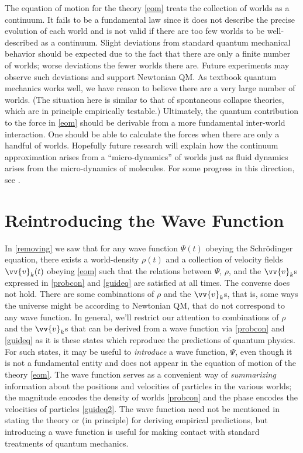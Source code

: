 \documentclass[12pt,secnumarabic,balancelastpage,amsmath,amssymb,nofootinbib]{article}
\begin{document}
The equation of motion for the theory \eqref{eom} treats the collection of worlds as a continuum.  It fails to be a fundamental law since it does not describe the precise evolution of each world and is not valid if there are too few worlds to be well-described as a continuum.  Slight deviations from standard quantum mechanical behavior should be expected due to the fact that there are only a finite number of worlds; worse deviations the fewer worlds there are.  Future experiments may observe such deviations and support Newtonian QM.  As textbook quantum mechanics works well, we have reason to believe there are a very large number of worlds.  (The situation here is similar to that of spontaneous collapse theories, which are in principle empirically testable.)  Ultimately, the quantum contribution to the force in \eqref{eom} should be derivable from a more fundamental inter-world interaction.  One should be able to calculate the forces when there are only a handful of worlds.  Hopefully future research will explain how the continuum approximation arises from a ``micro-dynamics'' of worlds just as fluid dynamics arises from the micro-dynamics of molecules.  For some progress in this direction, see \citet{HDW}.

\section{Reintroducing the Wave Function}\label{defining}

In \textsection \ref{removing} we saw that for any wave function $\Psi(t)$ obeying the Schr\"{o}dinger equation, there exists a world-density $\rho(t)$ and a collection of velocity fields $\vv{v}_k(t)$ obeying \eqref{eom} such that the relations between $\Psi$, $\rho$, and the $\vv{v}_k$s expressed in \eqref{probcon} and \eqref{guideq} are satisfied at all times.  The converse does not hold.  There are some combinations of $\rho$ and the $\vv{v}_k$s, that is, some ways the universe might be according to Newtonian QM, that do not correspond to any wave function.  In general, we'll restrict our attention to combinations of $\rho$ and the $\vv{v}_k$s that can be derived from a wave function via \eqref{probcon} and \eqref{guideq} as it is these states which reproduce the predictions of quantum physics.  For such states, it may be useful to \emph{introduce} a wave function, $\Psi$, even though it is not a fundamental entity and does not appear in the equation of motion of the theory \eqref{eom}.  The wave function serves as a convenient way of \emph{summarizing} information about the positions and velocities of particles in the various worlds; the magnitude encodes the density of worlds \eqref{probcon} and the phase encodes the velocities of particles \eqref{guideq2}.  The wave function need not be mentioned in stating the theory or (in principle) for deriving empirical predictions, but introducing a wave function is useful for making contact with standard treatments of quantum mechanics.
\end{document}
